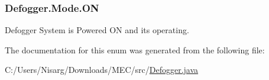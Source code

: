 \hypertarget{enum_defogger_1_1_mode_a76d70f9c05cdf1a27e30af22fb60da1b}{}
\subsubsection[{O\+N}]{\setlength{\rightskip}{0pt plus 5cm}Defogger.\+Mode.\+O\+N}\label{enum_defogger_1_1_mode_a76d70f9c05cdf1a27e30af22fb60da1b}


Defogger System is Powered O\+N and its operating. 



The documentation for this enum was generated from the following file\+:\begin{DoxyCompactItemize}
\item 
C\+:/\+Users/\+Nisarg/\+Downloads/\+M\+E\+C/src/\hyperlink{_defogger_8java}{Defogger.\+java}\end{DoxyCompactItemize}
